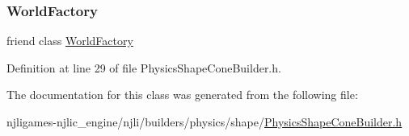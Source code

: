 \subsubsection{\texorpdfstring{World\+Factory}{WorldFactory}}
{\footnotesize\ttfamily friend class \mbox{\hyperlink{classnjli_1_1_world_factory}{World\+Factory}}\hspace{0.3cm}{\ttfamily [friend]}}



Definition at line 29 of file Physics\+Shape\+Cone\+Builder.\+h.



The documentation for this class was generated from the following file\+:\begin{DoxyCompactItemize}
\item 
njligames-\/njlic\+\_\+engine/njli/builders/physics/shape/\mbox{\hyperlink{_physics_shape_cone_builder_8h}{Physics\+Shape\+Cone\+Builder.\+h}}\end{DoxyCompactItemize}
